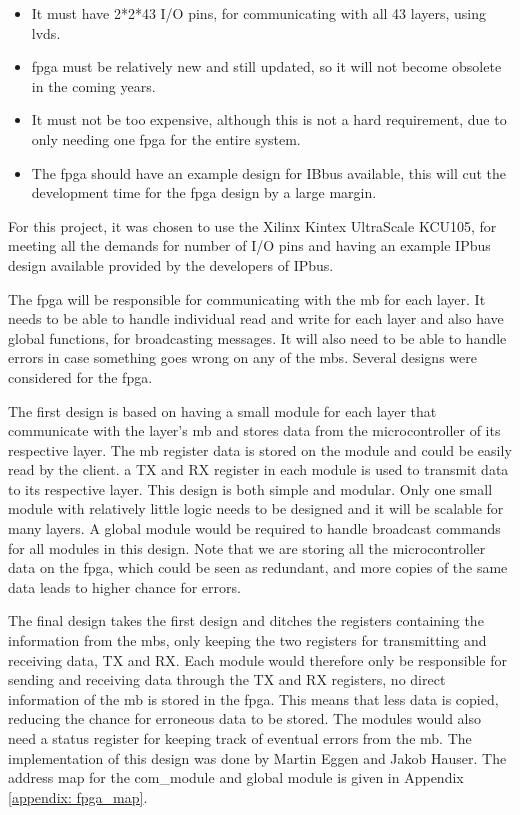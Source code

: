 \documentclass[main.tex]{subfiles}
\begin{document}
\begin{itemize}
    \item It must have 2*2*43 I/O pins, for communicating with all 43 layers, using \acrshort{lvds}.
    \item \gls{fpga} must be relatively new and still updated, so it will not become obsolete in the coming years.
    \item It must not be too expensive, although this is not a hard requirement, due to only needing one \gls{fpga} for the entire system.
    \item The \gls{fpga} should have an example design for IBbus available, this will cut the development time for the \gls{fpga} design by a large margin.
\end{itemize}

For this project, it was chosen to use the Xilinx Kintex UltraScale KCU105, for meeting all the demands for number of I/O pins and having an example IPbus design available provided by the developers of IPbus.


The \gls{fpga} will be responsible for communicating with the \gls{mb} for each layer. It needs to be able to handle individual read and write for each layer and also have global functions, for broadcasting messages. It will also need to be able to handle errors in case something goes wrong on any of the \gls{mb}s. Several designs were considered for the \gls{fpga}.

The first design is based on having a small module for each layer that communicate with the layer's \gls{mb} and stores data from the microcontroller of its respective layer. The \gls{mb} register data is stored on the module and could be easily read by the client. a TX and RX register in each module is used to transmit data to its respective layer. This design is both simple and modular. Only one small module with relatively little logic needs to be designed and it will be scalable for many layers. A global module would be required to handle broadcast commands for all modules in this design. Note that we are storing all the microcontroller data on the \gls{fpga}, which could be seen as redundant, and more copies of the same data leads to higher chance for errors.

The final design takes the first design and ditches the registers containing the information from the \gls{mb}s, only keeping the two registers for transmitting and receiving data, TX and RX. Each module would therefore only be responsible for sending and receiving data through the TX and RX registers, no direct information of the \gls{mb} is stored in the \gls{fpga}. This means that less data is copied, reducing the chance for erroneous data to be stored. The modules would also need a status register for keeping track of eventual errors from the \gls{mb}. The implementation of this design was done by Martin Eggen and Jakob Hauser. The address map for the com\_module and global module is given in Appendix \ref{appendix: fpga_map}. 
\end{document}

